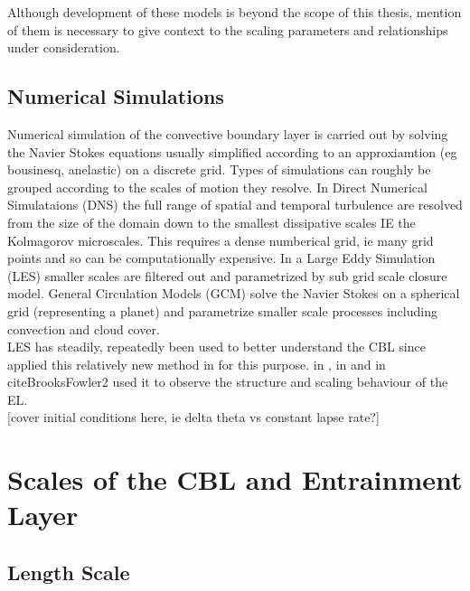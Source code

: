 Although development of these models is beyond the scope of this thesis, mention of them is necessary to give context to the scaling 
parameters and relationships under consideration. \\         

\subsection{Numerical Simulations}
\label{subsec:}

Numerical simulation of the convective boundary layer is carried out by solving the Navier Stokes equations usually simplified according to an approxiamtion (eg bousinesq, anelastic) on a discrete grid.  Types of simulations can roughly be grouped according to the scales of motion they resolve.  In Direct Numerical Simulataions (\acs{DNS}) the full range of spatial and temporal turbulence are resolved from the size of the domain down to the smallest dissipative scales IE the Kolmagorov microscales.  This requires a dense numberical grid, ie many grid points and so can be computationally expensive.  In a Large Eddy Simulation (\acs{LES}) smaller scales are filtered out and parametrized by sub grid scale closure model. General Circulation Models (\acs{GCM}) solve the Navier Stokes on a spherical grid (representing a planet) and parametrize smaller scale processes including convection and cloud cover.\\

\acs{LES} has steadily, repeatedly been used to better understand the \acs{CBL} since \citeauthor{Deardorff72} applied this relatively 
new method in \cite{Deardorff72} for this purpose.  \citeauthor{SullMoengStev} in \cite{SullMoengStev}, \citeauthor{FedConzMir04} in \cite{FedConzMir04} and \citeauthor{BrooksFowler2} in cite{BrooksFowler2} used it to observe the structure and scaling behaviour of the \acs{EL}.\\

[cover initial conditions here, ie delta theta vs constant lapse rate?]

\section{Scales of the CBL and Entrainment Layer}
\label{sec:}

\subsection{Length Scale}
\label{subsec:}


